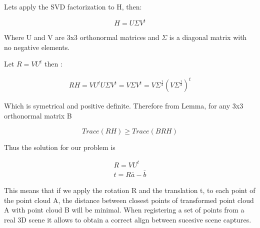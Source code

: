 Lets apply the SVD factorization to H, then:

\[ H = U \Sigma V^t \]

Where U and V are 3x3 orthonormal matrices and $\Sigma$ is a diagonal matrix with no negative elements.

Let $ R = V U^t $ then :

\begin{align*}
RH = VU^t U \Sigma V^t = V \Sigma V^t = V \Sigma^{\frac{1}{2}} (V \Sigma^{\frac{1}{2}})^t
\end{align*}

Which is symetrical and positive definite.
Therefore from Lemma, for any 3x3 orthonormal matrix B

\[ Trace( R H ) \geq Trace( B R H ) \]

Thus the solution for our problem is 

\begin{align*}
R = V U^t \\
t = R \bar{a} - \bar{b}
\end{align*}


This means that if we apply the rotation R and the translation t, to each point of the point cloud A, the distance between closest points of 
transformed point cloud A with point cloud B will be minimal. When registering a set of points from a real 3D scene it allows to obtain a correct 
align between sucesive scene captures.

